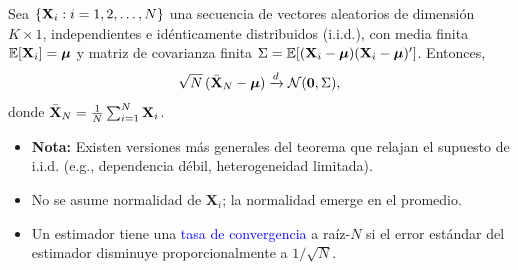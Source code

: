 \documentclass[10pt, xcolor=dvipsnames]{beamer}
\begin{document}
\begin{frame}[plain]
\begin{tcolorbox}[colback=white, arc=0mm, boxrule=0.5pt, 
    title=\textbf{Teorema del límite central (CLT) – Lindeberg–Lévy}, breakable]
    Sea \(\{\textbf{X}_i : i=1,2,\ldots,N\}\) una secuencia de vectores aleatorios 
    de dimensión \(K \times 1\), independientes e idénticamente distribuidos (i.i.d.), 
    con media finita \(\operatorname{\mathbb{E}}[\textbf{X}_i] = \boldsymbol{\mu}\) y matriz de covarianza finita 
    \(\Sigma = \operatorname{\mathbb{E}}[(\textbf{X}_i - \boldsymbol{\mu})(\textbf{X}_i - \boldsymbol{\mu})']\). Entonces,
    \[
        \sqrt{N}\,(\bar{\textbf{X}}_N - \boldsymbol{\mu}) \xrightarrow{d} \mathcal{N}(\textbf{0},\Sigma),
    \]
    donde \(\bar{\textbf{X}}_N = \tfrac{1}{N}\sum_{i=1}^{N}\textbf{X}_i\).
\end{tcolorbox}
\begin{itemize}
    \item \textbf{Nota:} Existen versiones más generales del teorema que relajan el supuesto de i.i.d. (e.g., dependencia débil, heterogeneidad limitada). %
    \item No se asume normalidad de $\mathbf{X}_i$; la normalidad emerge en el promedio. %
    \item Un estimador tiene una \textcolor{blue}{tasa de convergencia} a raíz-$N$ si el error estándar del estimador disminuye proporcionalmente a $1/\sqrt{N}$.
\end{itemize}
\end{frame}
\end{document}
